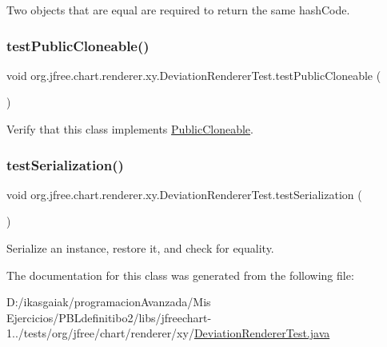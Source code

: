 Two objects that are equal are required to return the same hash\+Code. \mbox{\label{classorg_1_1jfree_1_1chart_1_1renderer_1_1xy_1_1_deviation_renderer_test_af825e06e353e3f800f2f0fa84448065e}} 
\subsubsection{\texorpdfstring{test\+Public\+Cloneable()}{testPublicCloneable()}}
{\footnotesize\ttfamily void org.\+jfree.\+chart.\+renderer.\+xy.\+Deviation\+Renderer\+Test.\+test\+Public\+Cloneable (\begin{DoxyParamCaption}{ }\end{DoxyParamCaption})}

Verify that this class implements \mbox{\hyperlink{}{Public\+Cloneable}}. \mbox{\label{classorg_1_1jfree_1_1chart_1_1renderer_1_1xy_1_1_deviation_renderer_test_a9561d3539f53afb52b7d26f287c2b970}} 
\subsubsection{\texorpdfstring{test\+Serialization()}{testSerialization()}}
{\footnotesize\ttfamily void org.\+jfree.\+chart.\+renderer.\+xy.\+Deviation\+Renderer\+Test.\+test\+Serialization (\begin{DoxyParamCaption}{ }\end{DoxyParamCaption})}

Serialize an instance, restore it, and check for equality. 

The documentation for this class was generated from the following file\+:\begin{DoxyCompactItemize}
\item 
D\+:/ikasgaiak/programacion\+Avanzada/\+Mis Ejercicios/\+P\+B\+Ldefinitibo2/libs/jfreechart-\/1../tests/org/jfree/chart/renderer/xy/\mbox{\hyperlink{_deviation_renderer_test_8java}{Deviation\+Renderer\+Test.\+java}}\end{DoxyCompactItemize}

